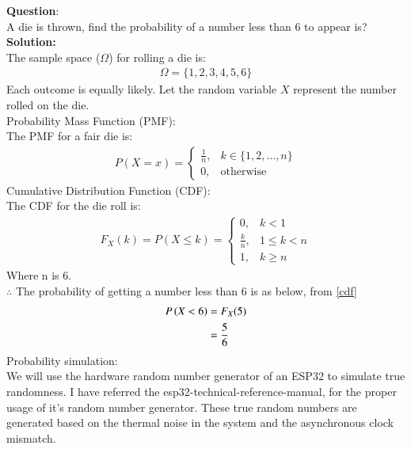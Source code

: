 \documentclass[journal]{IEEEtran}
\begin{document}
	
\textbf{Question}:\\
A die is thrown, find the probability of a number less than 6 to appear is?
\\
\textbf{Solution: }\\
The sample space (\( \Omega \)) for rolling a die is:
\begin{align}
\Omega = \{1, 2, 3, 4, 5, 6\}
\end{align}
Each outcome is equally likely.
Let the random variable \( X \) represent the number rolled on the die.\\
Probability Mass Function (PMF): \\
The PMF for a fair die is:
\begin{align}
P(X = x) =
\begin{cases}
	\frac{1}{n}, & k \in \{1, 2,\dots ,n\} \\
	0, & \text{otherwise}
\end{cases}
\end{align}
Cumulative Distribution Function (CDF): \\
The CDF for the die roll is:
\begin{align}
	F_X(k) = P(X \leq k) =
	\begin{cases}
		0, & k < 1 \\
		\frac{k}{n}, & 1 \leq k < n\\
		1, & k \geq n
	\end{cases} \label{cdf}
\end{align}
Where n is 6. \\ 
$\therefore$ The probability of getting a number less than 6 is as below, from \eqref{cdf}
\begin{align}
	P\left(X < 6\right) &= F_X(5) \\  &= \frac{5}{6}
\end{align} 
Probability simulation: \\ 
We will use the hardware random number generator of an ESP32 to simulate true randomness. 
I have referred the esp32-technical-reference-manual, for the proper usage of it's random number generator. These true random numbers are generated based on the thermal noise in the system
and the asynchronous clock mismatch.
\end{document}
